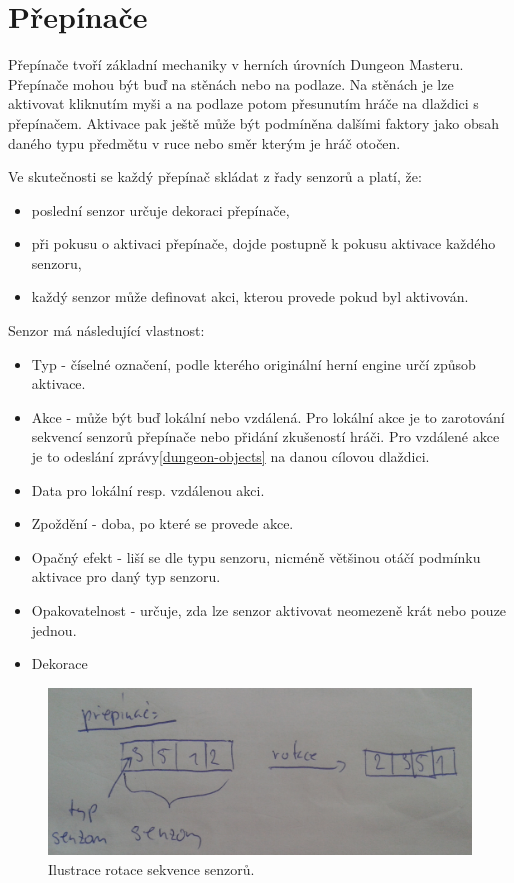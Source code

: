 \section{Přepínače}\label{actuator-analyza}
Přepínače tvoří základní mechaniky v herních úrovních Dungeon Masteru. Přepínače mohou být buď na stěnách nebo na podlaze. 
Na stěnách je lze aktivovat kliknutím myši a na podlaze potom přesunutím hráče na dlaždici s přepínačem. Aktivace pak ještě
může být podmíněna dalšími faktory jako obsah daného typu předmětu v ruce nebo směr kterým je hráč otočen.  

Ve skutečnosti se každý přepínač skládat z řady senzorů a platí, že:
\begin{itemize}
\item poslední senzor určuje dekoraci přepínače,
\item při pokusu o aktivaci přepínače, dojde postupně k pokusu aktivace každého senzoru,
\item každý senzor může definovat akci, kterou provede pokud byl aktivován.
\end{itemize}

Senzor má následující vlastnost:
\begin{itemize}
\item Typ - číselné označení, podle kterého originální herní engine určí způsob aktivace.
\item Akce - může být buď lokální nebo vzdálená. Pro lokální akce je to zarotování sekvencí senzorů 
	přepínače nebo přidání zkušeností hráči. Pro vzdálené akce je to odeslání zprávy\vref{dungeon-objects} na danou cílovou dlaždici. 
\item Data pro lokální resp. vzdálenou akci.
\item Zpoždění - doba, po které se provede akce.
\item Opačný efekt - liší se dle typu senzoru, nicméně většinou otáčí podmínku aktivace pro daný typ senzoru. 
\item Opakovatelnost - určuje, zda lze senzor aktivovat neomezeně krát nebo pouze jednou.
\item Dekorace  
\end{itemize}

\begin{figure}[H]\centering
\includegraphics[width=\textwidth]{./img/actuator-rotation.png}
\caption{Ilustrace rotace sekvence senzorů.}
\label{actuator-rotation}
\end{figure}



